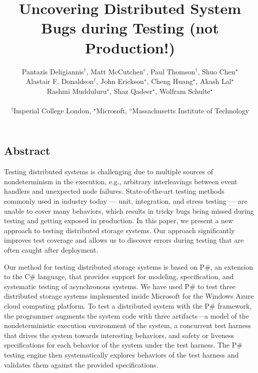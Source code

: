 \documentclass[letterpaper,twocolumn,10pt]{article}
\newcommand{\psharp}{P\#\xspace}
\newcommand{\csharp}{C\#\xspace}
\begin{document}
\date{}

\title{\Large \bf Uncovering Distributed System Bugs during Testing (not Production!)}

\author{
{\rm Pantazis Deligiannis$^\dagger$, Matt McCutchen$^\diamond$, Paul Thomson$^\dagger$, Shuo Chen$^\star$}\\
{\rm Alastair F. Donaldson$^\dagger$, John Erickson$^\star$, Cheng Huang$^\star$, Akash Lal$^\star$}\\
{\rm Rashmi Mudduluru$^\star$, Shaz Qadeer$^\star$, Wolfram Schulte$^\star$}\\\\
$^\dagger$Imperial College London, $^\star$Microsoft, $^\diamond$Massachusetts Institute of Technology\\
} %

\maketitle

\thispagestyle{empty}


\subsection*{Abstract}
Testing distributed systems is challenging due to multiple sources of nondeterminism in the execution, e.g., arbitrary interleavings between event handlers and unexpected node failures.
State-of-the-art testing methods commonly used in industry today --- unit, integration, and stress testing --- are unable to cover many behaviors, which results in tricky bugs being missed during testing and getting exposed in production.
In this paper, we present a new approach to testing distributed storage systems.
Our approach significantly improves test coverage and allows us to discover errors during testing that are often caught after deployment.

Our method for testing distributed storage systems is based on \psharp, an extension to the \csharp language,
that provides support for modeling, specification, and systematic testing of asynchronous systems.
We have used \psharp to test three distributed storage systems implemented inside Microsoft for the Windows Azure cloud computing platform.
To test a distributed system with the \psharp framework, the programmer augments the system code with three artifacts---a model of the nondeterministic execution environment of the system, a concurrent test harness that drives the system towards interesting behaviors, and safety or liveness specifications for each behavior of the system under the test harness.
The \psharp testing engine then systematically explores behaviors of the test harness and validates them against the provided specifications.
\end{document}
